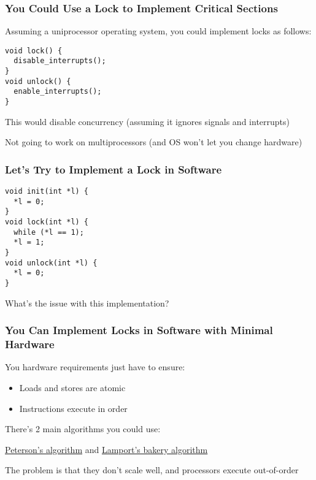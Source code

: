   \begin{frame}[fragile]
    \frametitle{You Could Use a Lock to Implement Critical Sections}

    Assuming a uniprocessor operating system, you could implement locks as follows:

    \vspace{2em}

    \begin{lstlisting}
void lock() {
  disable_interrupts();
}
void unlock() {
  enable_interrupts();
}   
    \end{lstlisting}

    \vspace{2em}

    This would disable concurrency (assuming it ignores signals and interrupts)

    \hspace{2em} Not going to work on multiprocessors (and OS won't let you change hardware)
  \end{frame}

  \begin{frame}[fragile]
    \frametitle{Let's Try to Implement a Lock in Software}

    \begin{lstlisting}
void init(int *l) {
  *l = 0;
}
void lock(int *l) {
  while (*l == 1);
  *l = 1;
}
void unlock(int *l) {
  *l = 0;
}   
    \end{lstlisting}

    What's the issue with this implementation?

    \vspace{2em}


    
  \end{frame}

  \begin{frame}
    \frametitle{You Can Implement Locks in Software with Minimal Hardware}

    You hardware requirements just have to ensure:
    \begin{itemize}
      \item Loads and stores are atomic
      \item Instructions execute in order
    \end{itemize}

    \vspace{2em}

    There's 2 main algorithms you could use:

    \hspace{2em}
    \href{https://en.wikipedia.org/wiki/Peterson\%27s_algorithm}
    {Peterson's algorithm}
    and
    \href{http://en.wikipedia.org/wiki/Lamport\%27s_bakery_algorithm}
         {Lamport's bakery algorithm}

    \vspace{2em}

    The problem is that they don't scale well, and processors execute
    out-of-order
  \end{frame}

